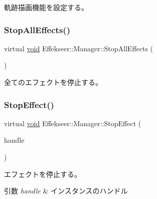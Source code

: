 軌跡描画機能を設定する。 

\mbox{\label{class_effekseer_1_1_manager_a65a6043aace92f52bcb8f7fc1052d3f0}} 
\subsubsection{\texorpdfstring{Stop\+All\+Effects()}{StopAllEffects()}}
{\footnotesize\ttfamily virtual \mbox{\hyperlink{namespace_effekseer_ab34c4088e512200cf4c2716f168deb56}{void}} Effekseer\+::\+Manager\+::\+Stop\+All\+Effects (\begin{DoxyParamCaption}{ }\end{DoxyParamCaption})\hspace{0.3cm}{\ttfamily [pure virtual]}}



全てのエフェクトを停止する。 

\mbox{\label{class_effekseer_1_1_manager_a7a4a9ff929146f8ea21aa4705b352baa}} 
\subsubsection{\texorpdfstring{Stop\+Effect()}{StopEffect()}}
{\footnotesize\ttfamily virtual \mbox{\hyperlink{namespace_effekseer_ab34c4088e512200cf4c2716f168deb56}{void}} Effekseer\+::\+Manager\+::\+Stop\+Effect (\begin{DoxyParamCaption}\item[{\mbox{\hyperlink{namespace_effekseer_afba58b8d812da862190e9bbfc040824a}{Handle}}}]{handle }\end{DoxyParamCaption})\hspace{0.3cm}{\ttfamily [pure virtual]}}



エフェクトを停止する。 


\begin{DoxyParams}{引数}
{\em handle} & インスタンスのハンドル \\
\hline
\end{DoxyParams}
\mbox{\label{class_effekseer_1_1_manager_adbde475d5977ca36c0a3a4c1e6878b33}} 
